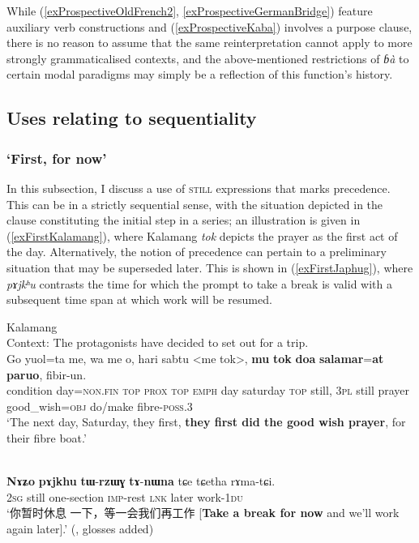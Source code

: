 While (\ref{exProspectiveOldFrench2}, \ref{exProspectiveGermanBridge}) feature auxiliary verb constructions and (\ref{exProspectiveKaba}) involves a purpose clause, there is no reason to assume that the same reinterpretation cannot apply to  more strongly grammaticalised  contexts, and the above-mentioned restrictions of  \textit{ɓà} to certain modal paradigms may simply be a reflection of this function's history. 

\subsection{Uses relating to sequentiality}\label{sectionTaxis}
\subsubsection{\lq{}First, for now\rq}\label{sectionFirst}
 In this subsection, I discuss a use of \textsc{still} expressions that marks precedence. This can be in a strictly sequential sense, with the situation depicted in the clause constituting the initial step in a series; an illustration is given in (\ref{exFirstKalamang}), where Kalamang \textit{tok} depicts the prayer as the first act of the day. Alternatively, the notion of precedence can pertain to a preliminary situation that may be superseded later. This is shown in (\ref{exFirstJaphug}), where  \textit{pɤjkʰu} contrasts the time for which the prompt to take a break is valid with a subsequent time span at which work will be resumed.

\begin{exe}
	 \ex Kalamang\label{exFirstKalamang}\\
	  Context: The protagonists have decided to set out for a trip.\\
	\gll Go yuol=ta me, wa me o, hari sabtu <me tok>, \textbf{mu} \textbf{tok} \textbf{doa} \textbf{salamar}=\textbf{at} \textbf{paruo}, fibir-un.\\
	condition day=\textsc{non}.\textsc{fin} \textsc{top}  \textsc{prox} \textsc{top} \textsc{emph} day saturday \phantom{<}\textsc{top} still, 3\textsc{pl} still prayer good\_wish=\textsc{obj} do/make fibre-\textsc{poss}.3\\
	\glt \lq The next day, Saturday, they first, \textbf{they first did the good wish prayer}, for their fibre boat.' \parencite{Visser2021b}

	\ex {}\label{exFirstJaphug}\\
	\gll \textbf{Nɤʑo} \textbf{pɤjkhu} \textbf{tɯ}-\textbf{rzɯɣ} \textbf{tɤ}-\textbf{nɯna} tɕe tɕetha rɤma-tɕi.\\
	2\textsc{sg} still one-section \textsc{imp}-rest \textsc{lnk} later work-1\textsc{du}\\
	\glt \lq {\cn 你暂时休息 一下，等一会我们再工作} [\textbf{Take a break for now} and we’ll work again later].' (\cite[361]{Jacques2016}, glosses added)
\end{exe}

